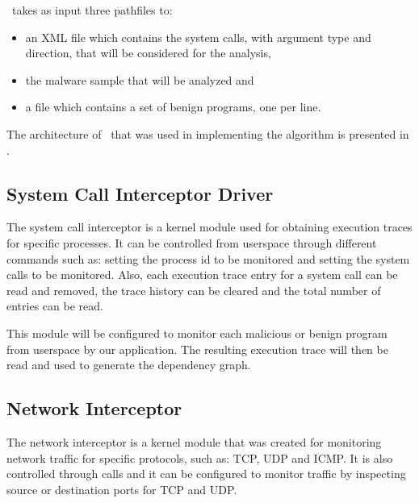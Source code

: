 \project\ takes as input three pathfiles to: 
\begin{itemize}
	\item an XML file which contains the system calls, with argument type and direction, that will be considered for the analysis,
	\item the malware sample that will be analyzed and
	\item a file which contains a set of benign programs, one per line.
\end{itemize}

The architecture of \project\ that was used in implementing the algorithm is presented in .


\subsection{System Call Interceptor Driver}

The system call interceptor is a kernel module used for obtaining execution traces for specific processes. It can be controlled from userspace through different  commands such as: setting the process id to be monitored and setting the system calls to be monitored. Also, each execution trace entry for a system call can be read and removed, the trace history can be cleared and the total number of entries can be read.

This module will be configured to monitor each malicious or benign program from userspace by our application. The resulting execution trace will then be read and used to generate the dependency graph.

\subsection{Network Interceptor}

The network interceptor is a kernel module that was created for monitoring network traffic for specific protocols, such as: TCP, UDP and ICMP. It is also controlled through  calls and it can be configured to monitor traffic by inspecting source or destination ports for TCP and UDP.

  

